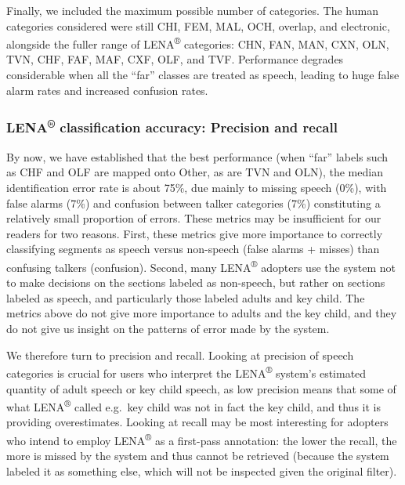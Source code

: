 \documentclass[english,table,man,floatsintext]{apa6}
\begin{document}
Finally, we included the maximum possible number of categories. The human categories considered were still CHI, FEM, MAL, OCH, overlap, and electronic, alongside the fuller range of LENA\textsuperscript{®} categories: CHN, FAN, MAN, CXN, OLN, TVN, CHF, FAF, MAF, CXF, OLF, and TVF. Performance degrades considerable when all the \enquote{far} classes are treated as speech, leading to huge false alarm rates and increased confusion rates.

\hypertarget{lena-classification-accuracy-precision-and-recall}{%
\subsubsection{\texorpdfstring{LENA\textsuperscript{®} classification accuracy: Precision and recall}{LENA® classification accuracy: Precision and recall}}\label{lena-classification-accuracy-precision-and-recall}}

By now, we have established that the best performance (when \enquote{far} labels such as CHF and OLF are mapped onto Other, as are TVN and OLN), the median identification error rate is about 75\%, due mainly to missing speech (0\%), with false alarms (7\%) and confusion between talker categories (7\%) constituting a relatively small proportion of errors. These metrics may be insufficient for our readers for two reasons. First, these metrics give more importance to correctly classifying segments as speech versus non-speech (false alarms + misses) than confusing talkers (confusion). Second, many LENA\textsuperscript{®} adopters use the system not to make decisions on the sections labeled as non-speech, but rather on sections labeled as speech, and particularly those labeled adults and key child. The metrics above do not give more importance to adults and the key child, and they do not give us insight on the patterns of error made by the system.

We therefore turn to precision and recall. Looking at precision of speech categories is crucial for users who interpret the LENA\textsuperscript{®} system's estimated quantity of adult speech or key child speech, as low precision means that some of what LENA\textsuperscript{®} called e.g.~key child was not in fact the key child, and thus it is providing overestimates. Looking at recall may be most interesting for adopters who intend to employ LENA\textsuperscript{®} as a first-pass annotation: the lower the recall, the more is missed by the system and thus cannot be retrieved (because the system labeled it as something else, which will not be inspected given the original filter).
\end{document}
